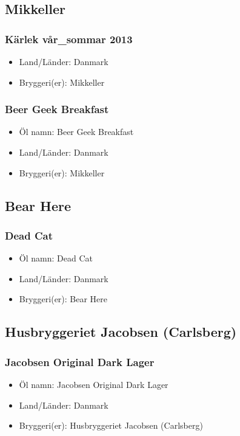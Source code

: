\documentclass[11pt]{article}
\begin{document}
\subsection{Mikkeller}
\label{sec:org0b5c511}
\subsubsection{Kärlek vår\_sommar 2013}
\label{sec:org912831f}
\begin{itemize}
\item Land/Länder: Danmark
\item Bryggeri(er): Mikkeller
\end{itemize}
\subsubsection{Beer Geek Breakfast}
\label{sec:org3397781}
\begin{itemize}
\item Öl namn: Beer Geek Breakfast
\item Land/Länder: Danmark
\item Bryggeri(er): Mikkeller
\end{itemize}
\subsection{Bear Here}
\label{sec:org9ba953e}
\subsubsection{Dead Cat}
\label{sec:org5b10e19}
\begin{itemize}
\item Öl namn: Dead Cat
\item Land/Länder: Danmark
\item Bryggeri(er): Bear Here
\end{itemize}
\subsection{Husbryggeriet Jacobsen (Carlsberg)}
\label{sec:orgf849eca}
\subsubsection{Jacobsen Original Dark Lager}
\label{sec:org476334b}
\begin{itemize}
\item Öl namn: Jacobsen Original Dark Lager
\item Land/Länder: Danmark
\item Bryggeri(er): Husbryggeriet Jacobsen (Carlsberg)
\end{itemize}
\end{document}
